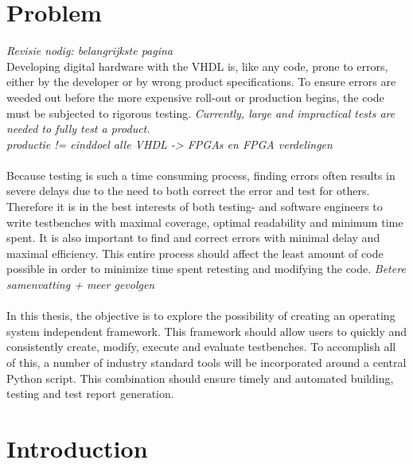 \documentclass[11pt,british]{article}
\begin{document}
\section{Problem}
\emph{\color{red}Revisie nodig: belangrijkste pagina} \\
Developing digital hardware with the \gls{VHDL} is, like any code, prone to errors, either by the developer or by wrong product specifications. To ensure errors are weeded out before the more expensive roll-out or production begins, the code must be subjected to rigorous testing. \emph{Currently, large and impractical tests are needed to fully test a product.}
\\
\emph{\color{red}productie != einddoel alle VHDL -> FPGAs en FPGA verdelingen}
\\
\\
Because testing is such a time consuming process, finding errors often results in severe delays due to the need to both correct the error and test for others. Therefore it is in the best interests of both testing- and software engineers to write testbenches with maximal coverage, optimal readability and minimum time spent. It is also important to find and correct errors with minimal delay and maximal efficiency. This entire process should affect the least amount of code possible in order to minimize time spent retesting and modifying the code.
\emph{\color{red} Betere samenvatting + meer gevolgen}
\\
\\
In this thesis, the objective is to explore the possibility of creating an operating system independent framework. This framework should allow users to quickly and consistently create, modify, execute and evaluate testbenches. To accomplish all of this, a number of industry standard tools will be incorporated around a central Python script. This combination should ensure timely and automated building, testing and test report generation.


\newpage{}


\section{Introduction}
\label{sec:intro}

\end{document}
